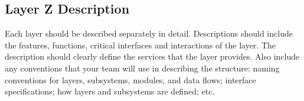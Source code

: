 \subsection{Layer Z Description}
Each layer should be described separately in detail. Descriptions should include the features, functions, critical interfaces and interactions of the layer. The description should clearly define the services that the layer provides. Also include any conventions that your team will use in describing the structure: naming conventions for layers, subsystems, modules, and data flows; interface specifications; how layers and subsystems are defined; etc. 

